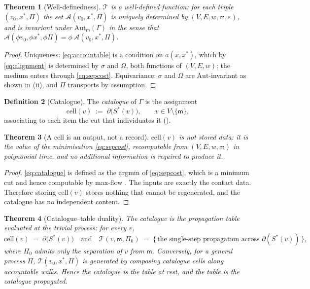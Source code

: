 \documentclass[11pt,twocolumn,a4paper]{article}
\theoremstyle{thmstyle}
\newtheorem{theorem}{Theorem}[section]
\theoremstyle{definition}
\newtheorem{definition}[theorem]{Definition}
\theoremstyle{remark}
\newcommand{\Gph}{\Gamma}
\newcommand{\V}{V}
\newcommand{\E}{E}
\newcommand{\wt}{w}
\newcommand{\med}{\mathsf{m}}
\newcommand{\cut}{\partial}
\newcommand{\str}{\sigma}
\newcommand{\acc}{\mathcal{A}}
\newcommand{\Proc}{\Pi}
\newcommand{\Tab}{\mathcal{T}}
\newcommand{\eps}{\varepsilon}
\begin{document}
\begin{theorem}[Well-definedness]
\label{thm:table-welldefined}
$\Tab$ is a well-defined function: for each triple $(v_0, x^{*},\Proc)$
the set $\acc(v_0,x^{*},\Proc)$ is uniquely determined by
$(\V,\E,\wt,\med,\eps)$, and is invariant under
$\mathrm{Aut}_\med(\Gph)$ in the sense that
$\acc(\phi v_0, \phi x^{*}, \phi\Proc) = \phi\,\acc(v_0,x^{*},\Proc)$.
\end{theorem}

\begin{proof}
Uniqueness: \eqref{eq:accountable} is a condition on $a(x,x^{*})$,
which by \eqref{eq:alignment} is determined by $\str$ and $\Omega$,
both functions of $(\V,\E,\wt)$; the medium enters through
\eqref{eq:sepcost}. Equivariance: $\str$ and $\Omega$ are
$\mathrm{Aut}$-invariant as shown in (ii), and
$\Proc$ transports by assumption.
\end{proof}

\begin{definition}[Catalogue]
\label{def:catalogue}
The \emph{catalogue} of $\Gph$ is the assignment
\begin{equation}
  \mathrm{cell}(v) \;:=\; \cut\bigl(S^{*}(v)\bigr),
  \qquad v \in \V \setminus \{\med\},
  \label{eq:catalogue}
\end{equation}
associating to each item the cut that individuates it
().
\end{definition}

\begin{theorem}[A cell is an output, not a record]
\label{thm:cell-is-output}
$\mathrm{cell}(v)$ is not stored data: it is the value of the
minimisation \eqref{eq:sepcost}, recomputable from
$(\V,\E,\wt,\med)$ in polynomial time, and no additional information
is required to produce it.
\end{theorem}

\begin{proof}
\eqref{eq:catalogue} is defined as the argmin of \eqref{eq:sepcost},
which is a minimum cut and hence computable by max-flow
\citep{fordfulkerson1956,stoer1997}. The inputs are exactly the
contact data. Therefore storing $\mathrm{cell}(v)$ stores nothing that
cannot be regenerated, and the catalogue has no independent content.
\end{proof}

\begin{theorem}[Catalogue--table duality]
\label{thm:catalogue-table}
The catalogue is the propagation table evaluated at the trivial
process: for every $v$,
\begin{equation}
  \mathrm{cell}(v) \;=\;
  \cut\bigl(S^{*}(v)\bigr)
  \quad\text{and}\quad
  \Tab(v, \med, \Proc_0) \;=\;
  \bigl\{\,\text{the single-step propagation across }
  \cut(S^{*}(v))\,\bigr\},
  \label{eq:duality}
\end{equation}
where $\Proc_0$ admits only the separation of $v$ from $\med$.
Conversely, for a general process $\Proc$, $\Tab(v_0,x^{*},\Proc)$ is
generated by composing catalogue cells along accountable walks. Hence
the catalogue is the table at rest, and the table is the catalogue
propagated.
\end{theorem}
\end{document}
